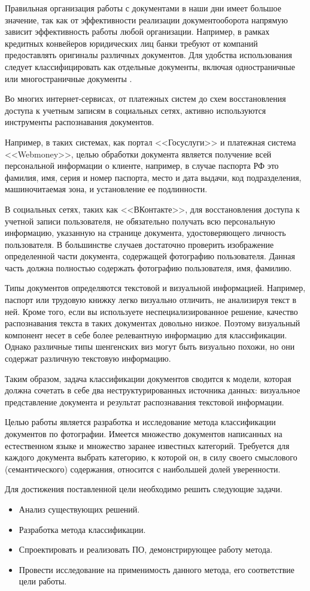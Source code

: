 \Introduction

Правильная организация работы с документами в наши дни имеет большое значение, так как от эффективности реализации документооборота напрямую зависит эффективность работы любой организации. Например, в рамках кредитных конвейеров юридических лиц банки требуют от компаний предоставлять оригиналы различных документов. Для удобства использования следует классифицировать как отдельные документы, включая одностраничные или многостраничные документы \cite{bank}.

Во многих интернет-сервисах, от платежных систем до схем восстановления доступа к учетным записям в социальных сетях, активно используются инструменты распознавания документов. 

Например, в таких системах, как портал <<Госуслуги>> и платежная система <<Webmoney>>, целью обработки документа является получение всей персональной информации о клиенте, например, в случае паспорта РФ это фамилия, имя, серия и номер паспорта, место и дата выдачи, код подразделения, машиночитаемая зона, и установление ее подлинности. 

В социальных сетях, таких как <<ВКонтакте>>, для восстановления доступа к учетной записи пользователя, не обязательно получать всю персональную информацию, указанную на странице документа, удостоверяющего личность пользователя. В большинстве случаев достаточно проверить изображение определенной части документа, содержащей фотографию пользователя. Данная часть должна полностью содержать фотографию пользователя, имя, фамилию. 

Типы документов определяются текстовой и визуальной информацией. Например, паспорт или трудовую книжку легко визуально отличить, не анализируя текст в ней. Кроме того, если вы используете неспециализированное решение, качество распознавания текста в таких документах довольно низкое. Поэтому визуальный компонент несет в себе более релевантную информацию для классификации. Однако различные типы шенгенских виз могут быть визуально похожи, но они содержат различную текстовую информацию.

Таким образом, задача классификации документов сводится к модели, которая должна сочетать в себе два неструктурированных источника данных: визуальное представление документа и результат распознавания текстовой информации.

Целью работы является разработка и исследование метода классификации документов по фотографии. Имеется множество документов написанных на естественном языке и множество заранее известных категорий. Требуется для каждого документа выбрать категорию, к которой он, в силу своего смыслового (семантического) содержания, относится с наибольшей долей уверенности.

Для достижения поставленной цели необходимо решить следующие задачи.
\begin{itemize}
\item Анализ существующих решений.
\item Разработка метода классификации.
\item Спроектировать и реализовать ПО, демонстрирующее работу метода.
\item Провести исследование на применимость данного метода, его соответствие цели работы.
\end{itemize}
